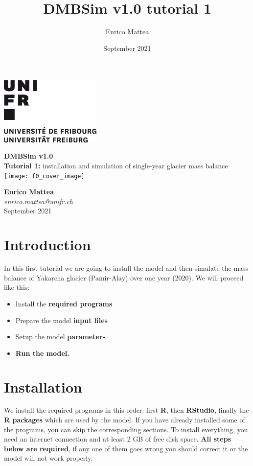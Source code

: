 \documentclass[15pt]{extarticle}
\title{DMBSim v1.0 tutorial 1}
\author{Enrico Mattea}
\date{September 2021}
\begin{document}

\begin{titlepage}
    \includegraphics[width=5cm]{unifr_logo}
    \par
    \vspace{2.0cm}
	\centering
	{\huge\textbf{DMBSim v1.0\\}}
	\vspace{0.3 cm}
	{\large \textbf{Tutorial 1:} installation and simulation of single-year glacier mass balance\\}
	\vspace{2.4 cm}
	\texttt{[image: f0\_cover\_image]}\par
	\vspace{2.1 cm}
	{\normalsize \textbf{Enrico Mattea}\\}
	{\normalsize \textit{enrico.mattea@unifr.ch\\}}
	\vspace{0.6 cm}
	{\normalsize September 2021}


	\vfill

\end{titlepage}


\section{Introduction}
In this first tutorial we are going to install the model and then simulate the mass balance of Yakarcha glacier (Pamir-Alay) over one year (2020).
We will proceed like this:
\begin{itemize}
    \item Install the \textbf{required programs}
    \item Prepare the model \textbf{input files}
    \item Setup the model \textbf{parameters}
    \item \textbf{Run the model.}
\end{itemize}


\section{Installation}
We install the required programs in this order: first \textbf{R}, then \textbf{RStudio}, finally the \textbf{R packages} which are used by the model. If you have already installed some of the programs, you can skip the corresponding sections.
To install everything, you need an internet connection and at least 2 GB of free disk space. \textbf{All steps below are required}, if any one of them goes wrong you should correct it or the model will not work properly.
\end{document}
